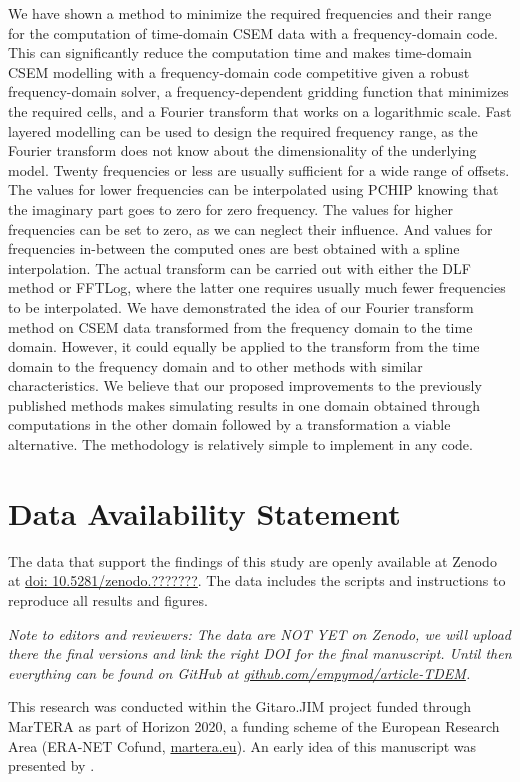 \documentclass[extra, camera,%
    onecolumn,   %
    referee,     %
]{gji}
\begin{document}
We have shown a method to minimize the required frequencies and their range for
the computation of time-domain CSEM data with a frequency-domain code. This can
significantly reduce the computation time and makes time-domain CSEM modelling
with a frequency-domain code competitive given a robust frequency-domain
solver, a frequency-dependent gridding function that minimizes the required
cells, and a Fourier transform that works on a logarithmic scale. Fast layered
modelling can be used to design the required frequency range, as the Fourier
transform does not know about the dimensionality of the underlying model.
Twenty frequencies or less are usually sufficient for a wide range of offsets.
The values for lower frequencies can be interpolated using PCHIP knowing that
the imaginary part goes to zero for zero frequency. The values for higher
frequencies can be set to zero, as we can neglect their influence. And values
for frequencies in-between the computed ones are best obtained with a spline
interpolation. The actual transform can be carried out with either the DLF
method or FFTLog, where the latter one requires usually much fewer frequencies
to be interpolated. We have demonstrated the idea of our Fourier transform
method on CSEM data transformed from the frequency domain to the time domain.
However, it could equally be applied to the transform from the time domain to
the frequency domain and to other methods with similar characteristics. We
believe that our proposed improvements to the previously published methods
makes simulating results in one domain obtained through computations in the
other domain followed by a transformation a viable alternative. The methodology
is relatively simple to implement in any code.

\section{Data Availability Statement} %

The data that support the findings of this study are openly available at Zenodo
at \href{https://zenodo.org/badge/DOI/10.5281/zenodo.???????}{doi:
10.5281/zenodo.???????}. The data includes the scripts and instructions to
reproduce all results and figures.

\emph{Note to editors and reviewers: The data are NOT YET on Zenodo, we will
upload there the final versions and link the right DOI for the final
manuscript. Until then everything can be found on GitHub at
\href{https://github.com/empymod/article-TDEM}%
{github.com/empymod/article-TDEM}.}


\begin{acknowledgments} %
This research was conducted within the Gitaro.JIM project funded through
MarTERA as part of Horizon 2020, a funding scheme of the European Research Area
(ERA-NET Cofund, \href{https://www.martera.eu}{martera.eu}). An early idea of
this manuscript was presented by \cite{EAGE.20.Werthmuller}.
\end{acknowledgments}





\label{lastpage}
\end{document}

